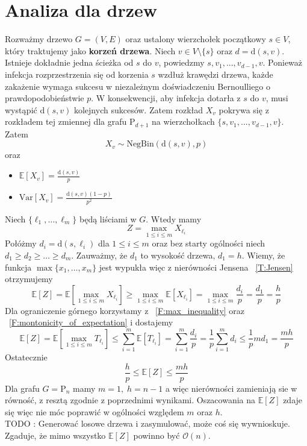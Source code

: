 \section{Analiza dla drzew}

Rozważmy drzewo $G = (V, E)$ oraz ustalony wierzchołek początkowy $s \in V$, 
który traktujemy jako \textbf{korzeń drzewa}. Niech $v\in V\setminus\{s\}$ oraz $d=\mathrm{d}(s,v)$. Istnieje dokładnie jedna ścieżka od $s$ do $v$, powiedzmy $s,v_1,...,v_{d-1}, v$. Ponieważ infekcja rozprzestrzenia się od korzenia $s$ wzdłuż krawędzi drzewa, 
każde zakażenie wymaga sukcesu w niezależnym doświadczeniu Bernoulliego o prawdopodobieństwie $p$.
W konsekwencji, aby infekcja dotarła z $s$ do $v$, 
musi wystąpić $\mathrm{d}(s,v)$ kolejnych sukcesów. Zatem rozkład $X_v$ pokrywa się z rozkładem tej zmiennej dla grafu $\mathrm{P}_{d+1}$ na wierzchołkach $\{s,v_1,...,v_{d-1}, v\}$. 
Zatem 
\[
    X_v\sim \mathrm{NegBin}(\mathrm{d}(s,v),p)
\]
oraz
\begin{itemize}
    \item $\mathbb{E}[X_v] = \frac{\mathrm{d}(s,v)}{p}$
    \item $\mathrm{Var}[X_v] = \frac{\mathrm{d}(s,v)(1 - p)}{p^2}$
\end{itemize}


Niech $\{\ell_1,\dots, \ell_m\}$ będą liściami w $G$. Wtedy mamy 
\[
    Z = \max_{1\le i \le m} X_{\ell _i}
\] 
Połóżmy $d_i=\mathrm{d}(s,\ell_i)$ dla $1\le i \le m$ oraz bez starty ogólności niech $d_1\ge d_2\ge\dots\ge d_m$. Zauważmy, że $d_1$ to wysokość drzewa, $d_1=h$.
Wiemy, że funkcja $\max\{x_1,\dots, x_m\}$ jest wypukła więc z nierówności Jensena ~\ref{T:Jensen} otrzymujemy
\[
    \mathbb{E}[Z]=\mathbb{E}[\max_{1\le i \le m} X_{\ell _i}] \ge \max_{1\le i \le m} \mathbb{E}[X_{\ell _i}] = \max_{1\le i \le m} \frac{d_i}{p} = \frac{d_1}{p} = \frac{h}{p}
\]
Dla ograniczenie górnego korzystamy z ~\ref{F:max_inequality} oraz ~\ref{F:montonicity_of_expectation} i dostajemy
\[
    \mathbb{E}[Z]=\mathbb{E}[\max_{1\le i \le m} T_{\ell _i}] \le \sum_{i=1}^{m}\mathbb{E}[T_{\ell _i}] = \sum_{i=1}^{m} \frac{d_i}{p} = \frac{1}{p} \sum_{i=1}^{m} d_i \le \frac{1}{p} md_1=\frac{mh}{p}
\]
Ostatecznie 
\[
  \frac{h}{p} \le \mathbb{E}[Z] \le \frac{mh}{p} 
\]
Dla grafu $G=\mathrm{P}_n$ mamy $m=1, \; h=n-1$ a więc nierówności zamieniają sie w równość, z resztą zgodnie z poprzednimi wynikami. Oszacowania na $\mathbb{E}[Z]$ zdaje się więc nie móc poprawić w ogólności względem $m$ oraz $h$. \\
TODO : Generować losowe drzewa i zasymulować, może coś się wywnioskuje. Zgaduje, że mimo wszystko $\mathbb{E}[Z]$ powinno być $\mathcal{O}(n)$.
